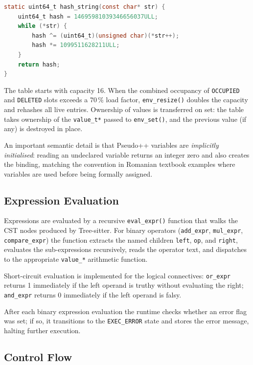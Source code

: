 \begin{lstlisting}[language=C, basicstyle=\ttfamily\small]
static uint64_t hash_string(const char* str) {
    uint64_t hash = 14695981039346656037ULL;
    while (*str) {
        hash ^= (uint64_t)(unsigned char)(*str++);
        hash *= 1099511628211ULL;
    }
    return hash;
}
\end{lstlisting}

The table starts with capacity 16.  When the combined occupancy of
\texttt{OCCUPIED} and \texttt{DELETED} slots exceeds a 70\,\% load factor,
\texttt{env\_resize()} doubles the capacity and rehashes all live entries.
Ownership of values is transferred on set: the table takes ownership of
the \texttt{value\_t*} passed to \texttt{env\_set()}, and the previous value
(if any) is destroyed in place.

An important semantic detail is that Pseudo++ variables are \emph{implicitly
initialised}: reading an undeclared variable returns an integer zero and also
creates the binding, matching the convention in Romanian textbook examples
where variables are used before being formally assigned.

\subsection{Expression Evaluation}
\label{subsec:expressions}

Expressions are evaluated by a recursive \texttt{eval\_expr()} function that
walks the CST nodes produced by Tree-sitter.  For binary operators
(\texttt{add\_expr}, \texttt{mul\_expr}, \texttt{compare\_expr}) the function
extracts the named children \texttt{left}, \texttt{op}, and \texttt{right},
evaluates the sub-expressions recursively, reads the operator text, and
dispatches to the appropriate \texttt{value\_*} arithmetic function.

Short-circuit evaluation is implemented for the logical connectives:
\texttt{or\_expr} returns 1 immediately if the left operand is truthy without
evaluating the right; \texttt{and\_expr} returns 0 immediately if the left
operand is falsy.

After each binary expression evaluation the runtime checks whether an error
flag was set; if so, it transitions to the \texttt{EXEC\_ERROR} state and
stores the error message, halting further execution.

\subsection{Control Flow}
\label{subsec:control-flow}

